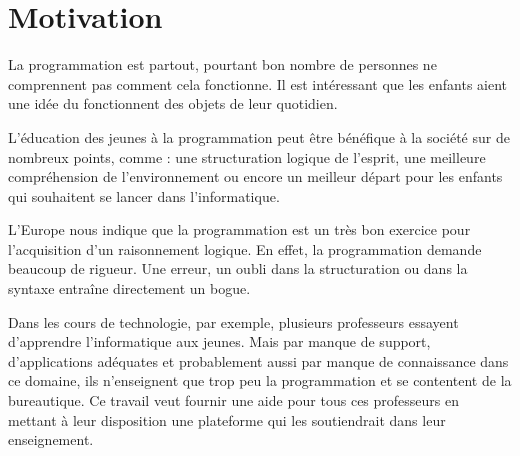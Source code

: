 \section{Motivation}
\label{intro-motivation}
La programmation est partout, pourtant bon nombre de personnes ne comprennent pas comment cela fonctionne. Il est intéressant que les enfants aient une idée du fonctionnent des objets de leur quotidien.

L'éducation des jeunes à la programmation peut être bénéfique à la société sur de nombreux points, comme : une structuration logique de l'esprit, une meilleure compréhension de l'environnement ou encore un meilleur départ pour les enfants qui souhaitent se lancer dans l'informatique.

L'Europe \cite{rapport-europeen} nous indique que la programmation est un très bon exercice pour l'acquisition d'un raisonnement logique. En effet, la programmation demande beaucoup de rigueur. Une erreur, un oubli dans la structuration ou dans la syntaxe entraîne directement un bogue. %

Dans les cours de technologie, par exemple, plusieurs professeurs essayent d'apprendre l'informatique aux jeunes. Mais par manque de support, d'applications adéquates et probablement aussi par manque de connaissance dans ce domaine, ils n'enseignent que trop peu la programmation et se contentent de la bureautique. Ce travail veut fournir une aide pour tous ces professeurs en mettant à leur disposition une plateforme qui les soutiendrait dans leur enseignement.

